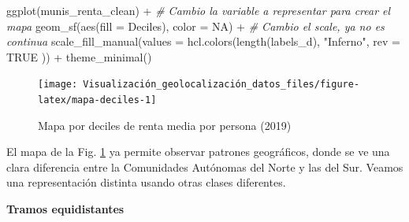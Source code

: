 \documentclass[
]{book}
\newenvironment{Shaded}{\begin{snugshade}}{\end{snugshade}}
\newcommand{\AttributeTok}[1]{\textcolor[rgb]{0.77,0.63,0.00}{#1}}
\newcommand{\CommentTok}[1]{\textcolor[rgb]{0.56,0.35,0.01}{\textit{#1}}}
\newcommand{\ConstantTok}[1]{\textcolor[rgb]{0.00,0.00,0.00}{#1}}
\newcommand{\FunctionTok}[1]{\textcolor[rgb]{0.00,0.00,0.00}{#1}}
\newcommand{\NormalTok}[1]{#1}
\newcommand{\OtherTok}[1]{\textcolor[rgb]{0.56,0.35,0.01}{#1}}
\newcommand{\SpecialCharTok}[1]{\textcolor[rgb]{0.00,0.00,0.00}{#1}}
\newcommand{\StringTok}[1]{\textcolor[rgb]{0.31,0.60,0.02}{#1}}
\theoremstyle{definition}
\theoremstyle{definition}
\theoremstyle{definition}
\theoremstyle{definition}
\theoremstyle{remark}
\begin{document}
\begin{Shaded}
\begin{Highlighting}[]
\FunctionTok{ggplot}\NormalTok{(munis\_renta\_clean) }\SpecialCharTok{+}
  \CommentTok{\# Cambio la variable a representar para crear el mapa}
  \FunctionTok{geom\_sf}\NormalTok{(}\FunctionTok{aes}\NormalTok{(}\AttributeTok{fill =}\NormalTok{ Deciles), }\AttributeTok{color =} \ConstantTok{NA}\NormalTok{) }\SpecialCharTok{+}
  \CommentTok{\# Cambio el scale, ya no es continua}
  \FunctionTok{scale\_fill\_manual}\NormalTok{(}\AttributeTok{values =} \FunctionTok{hcl.colors}\NormalTok{(}\FunctionTok{length}\NormalTok{(labels\_d),}
    \StringTok{"Inferno"}\NormalTok{,}
    \AttributeTok{rev =} \ConstantTok{TRUE}
\NormalTok{  )) }\SpecialCharTok{+}
  \FunctionTok{theme\_minimal}\NormalTok{()}
\end{Highlighting}
\end{Shaded}

\begin{figure}

{\centering \texttt{[image: Visualización\_geolocalización\_datos\_files/figure-latex/mapa-deciles-1]} 

}

\caption{Mapa por deciles de renta media por persona (2019)}\label{fig:mapa-deciles}
\end{figure}

El mapa de la Fig. \ref{fig:mapa-deciles} ya permite observar patrones
geográficos, donde se ve una clara diferencia entre la Comunidades Autónomas del
Norte y las del Sur. Veamos una representación distinta usando otras clases
diferentes.

\textbf{Tramos equidistantes}

\begin{Shaded}
\end{Shaded}
\end{document}
